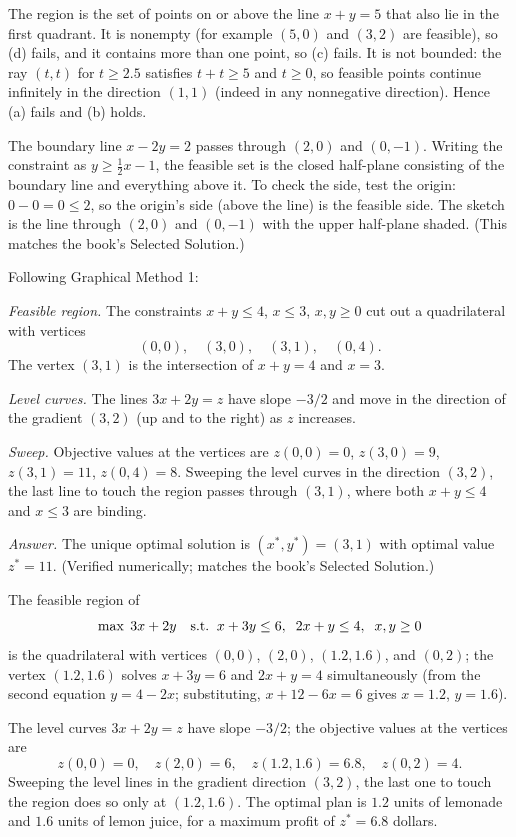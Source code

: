 The region is the set of points on or above the line $x + y = 5$ that also lie in the first quadrant. It is nonempty (for example $(5,0)$ and $(3,2)$ are feasible), so (d) fails, and it contains more than one point, so (c) fails. It is not bounded: the ray $(t,t)$ for $t \geq 2.5$ satisfies $t + t \geq 5$ and $t \geq 0$, so feasible points continue infinitely in the direction $(1,1)$ (indeed in any nonnegative direction). Hence (a) fails and (b) holds.

The boundary line $x - 2y = 2$ passes through $(2,0)$ and $(0,-1)$. Writing the constraint as $y \geq \tfrac{1}{2}x - 1$, the feasible set is the closed half-plane consisting of the boundary line and everything above it. To check the side, test the origin: $0 - 0 = 0 \leq 2$, so the origin's side (above the line) is the feasible side. The sketch is the line through $(2,0)$ and $(0,-1)$ with the upper half-plane shaded. (This matches the book's Selected Solution.)

Following Graphical Method 1:

\emph{Feasible region.} The constraints $x+y \leq 4$, $x \leq 3$, $x,y \geq 0$ cut out a quadrilateral with vertices
\[
(0,0), \quad (3,0), \quad (3,1), \quad (0,4).
\]
The vertex $(3,1)$ is the intersection of $x + y = 4$ and $x = 3$.

\emph{Level curves.} The lines $3x + 2y = z$ have slope $-3/2$ and move in the direction of the gradient $(3,2)$ (up and to the right) as $z$ increases.

\emph{Sweep.} Objective values at the vertices are $z(0,0)=0$, $z(3,0)=9$, $z(3,1)=11$, $z(0,4)=8$. Sweeping the level curves in the direction $(3,2)$, the last line to touch the region passes through $(3,1)$, where both $x+y \leq 4$ and $x \leq 3$ are binding.

\emph{Answer.} The unique optimal solution is $(x^*,y^*) = (3,1)$ with optimal value $z^* = 11$. (Verified numerically; matches the book's Selected Solution.)

The feasible region of
\[
\max\; 3x + 2y \quad \text{s.t.}\;\; x + 3y \leq 6, \;\; 2x + y \leq 4, \;\; x, y \geq 0
\]
is the quadrilateral with vertices $(0,0)$, $(2,0)$, $(1.2, 1.6)$, and $(0,2)$; the vertex $(1.2,1.6)$ solves $x + 3y = 6$ and $2x + y = 4$ simultaneously (from the second equation $y = 4 - 2x$; substituting, $x + 12 - 6x = 6$ gives $x = 1.2$, $y = 1.6$).

The level curves $3x + 2y = z$ have slope $-3/2$; the objective values at the vertices are
\[
z(0,0) = 0, \quad z(2,0) = 6, \quad z(1.2,1.6) = 6.8, \quad z(0,2) = 4.
\]
Sweeping the level lines in the gradient direction $(3,2)$, the last one to touch the region does so only at $(1.2, 1.6)$. The optimal plan is $1.2$ units of lemonade and $1.6$ units of lemon juice, for a maximum profit of $z^* = 6.8$ dollars.

